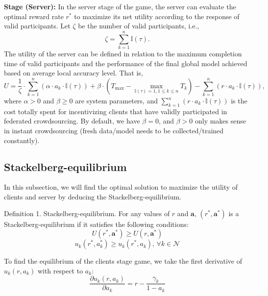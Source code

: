 \documentclass[final,1p,times]{elsarticle}
\begin{document}
\textbf{Stage \uppercase\expandafter{} (Server):} In the server stage of the game, the server can evaluate the optimal reward rate $r^\ast$ to maximize its net utility according to the response of valid participants. Let $\zeta$ be the number of valid participants, i.e.,
\begin{equation}
	\zeta = \sum_{k=1}^n\mathbb{I}(\tau).
\end{equation}
The utility of the server can be defined in relation to the maximum completion time of valid participants and the performance of the final global model achieved based on average local accuracy level. That is, 
\begin{equation}
	U = \frac{1}{\zeta}\cdot \sum_{k=1}^n\left(\alpha\cdot a_k\cdot \mathbb{I}(\tau)\right) + \beta\cdot(T_{\max}-\max_{\mathbb{I}(\tau)=1,1\le k\le n}T_k) - \sum_{k=1}^n\left(r\cdot a_k\cdot \mathbb{I}(\tau)\right),
\end{equation}
where $\alpha > 0$ and $\beta \ge 0$ are system parameters, and $\sum_{k=1}^n(r\cdot a_k\cdot \mathbb{I}(\tau))$ is the cost totally spent for incentivizing clients that have validly participated in federated crowdsourcing. By default, we have $\beta = 0$, and $\beta > 0$ only makes sense in instant crowdsourcing (fresh data/model needs to be collected/trained constantly).

\subsection{Stackelberg-equilibrium}
In this subsection, we will find the optimal solution to maximize the utility of clients and server by deducing the Stackelberg-equilibrium. 

Definition 1. Stackelberg-equilibrium. For any values of $r$ and $\bm{a}$, $(r^\ast,\bm{a}^\ast)$ is a Stackelberg-equilibrium if  it satisfies the following conditions:
\begin{equation}
	U(r^\ast,\bm{a}^\ast) \ge U(r,\bm{a}^\ast)
\end{equation}	
\begin{equation}
	u_k(r^\ast,a_k^\ast) \ge u_k(r^\ast,a_k),\, \forall k \in \bm{\mathcal{N}}
\end{equation}	

To find the equilibrium of the clients stage game, we take the first derivative of $u_k(r,a_k)$ with respect to $a_k$:
\begin{equation}
	\frac{\partial u_k(r,a_k)}{\partial a_k} = r-\frac{\gamma_k}{1-a_k}
\end{equation}	
\end{document}
